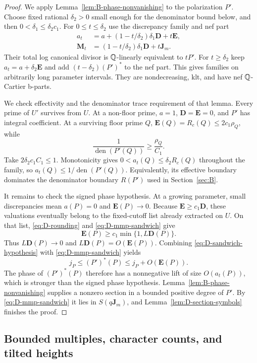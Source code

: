 \begin{proof}
We apply Lemma~\ref{lem:B-phase-nonvanishing} to the polarization $P'$.
Choose fixed rational $\delta_2>0$ small enough for the denominator bound
below, and then $0<\delta_1\le\delta_2c_1$.  For
$0\le t\le\delta_2$ use the discrepancy family and nef part
\begin{align*}
 a_t&=a+(1-t/\delta_2)\delta_1\mathbf D+t\mathbf E,\\
 \mathbf M_t&=(1-t/\delta_2)\delta_1\mathbf D+t\mathbf J_m.
\end{align*}
Their total log canonical divisor is $\mathbb Q$-linearly equivalent to $tP'$.
For $t\ge\delta_2$ keep $a_t=a+\delta_2\mathbf E$ and add
$(t-\delta_2)(P')^*$ to the nef part.  This gives families on arbitrarily
long parameter intervals.  They are nondecreasing, klt, and have nef
$\mathbb Q$-Cartier b-parts.

We check effectivity and the denominator trace requirement of that lemma.
Every prime of $U'$ survives from $U$.  At a non-floor prime,
$a=1$, $\mathbf D=\mathbf E=0$, and $P'$ has integral coefficient.
At a surviving floor prime $Q$,
$\mathbf E(Q)=R_c(Q)\le2c_1\rho_Q$, while
\[
 \frac1{\operatorname{den}(P'(Q))}\ge\frac{\rho_Q}{C_1}.
\]
Take $2\delta_2c_1C_1\le1$.  Monotonicity gives
$0<a_t(Q)\le\delta_2R_c(Q)$ throughout the family, so
$a_t(Q)\le1/\operatorname{den}(P'(Q))$.  Equivalently, its effective
boundary dominates the denominator boundary $R(P')$ used in
Section~\ref{sec:B}.

It remains to check the signed phase hypothesis.  At a growing parameter,
small discrepancies mean $a(P)=0$ and $\mathbf E(P)\to0$.
Because $\mathbf E\ge c_1\mathbf D$, these valuations eventually belong
to the fixed-cutoff list already extracted on $U$.  On that list,
\eqref{eq:D-rounding} and \eqref{eq:D-mmp-sandwich} give
\[
 \mathbf E(P)\ge c_1\min\{1,L\mathbf D(P)\}.
\]
Thus $L\mathbf D(P)\to0$ and
$L\mathbf D(P)=O(\mathbf E(P))$.  Combining
\eqref{eq:D-sandwich-hypothesis} with
\eqref{eq:D-mmp-sandwich} yields
\[
 j_P\le(P')^*(P)\le j_P+O(\mathbf E(P)).
\]
The phase of $(P')^*(P)$ therefore has a nonnegative lift of size
$O(a_t(P))$, which is stronger than the signed phase hypothesis.
Lemma~\ref{lem:B-phase-nonvanishing} supplies a nonzero section in a
bounded positive degree of $P'$.  By
\eqref{eq:D-mmp-sandwich} it lies in $S(q\mathbf J_m)$, and
Lemma~\ref{lem:D-section-symbols} finishes the proof.
\end{proof}

\subsection{Bounded multiples, character counts, and tilted heights}

